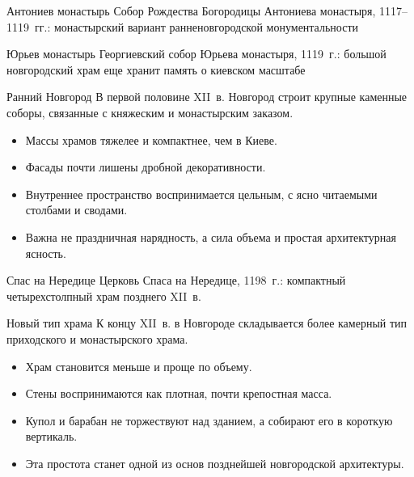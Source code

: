 \begin{frame}{Антониев монастырь}
    {Собор Рождества Богородицы Антониева монастыря, 1117--1119~гг.:
     монастырский вариант ранненовгородской монументальности}
\end{frame}

\begin{frame}{Юрьев монастырь}
    {Георгиевский собор Юрьева монастыря, 1119~г.:
     большой новгородский храм еще хранит память о киевском масштабе}
\end{frame}

\begin{frame}{Ранний Новгород}
  В первой половине XII~в. Новгород строит крупные каменные соборы,
  связанные с княжеским и монастырским заказом.

  \begin{itemize}
    \item Массы храмов тяжелее и компактнее, чем в Киеве.
    \item Фасады почти лишены дробной декоративности.
    \item Внутреннее пространство воспринимается цельным,
          с ясно читаемыми столбами и сводами.
    \item Важна не праздничная нарядность, а сила объема
          и простая архитектурная ясность.
  \end{itemize}
\end{frame}

\begin{frame}{Спас на Нередице}
    {Церковь Спаса на Нередице, 1198~г.:
     компактный четырехстолпный храм позднего XII~в.}
\end{frame}

\begin{frame}{Новый тип храма}
  К концу XII~в. в Новгороде складывается более камерный тип
  приходского и монастырского храма.

  \begin{itemize}
    \item Храм становится меньше и проще по объему.
    \item Стены воспринимаются как плотная, почти крепостная масса.
    \item Купол и барабан не торжествуют над зданием,
          а собирают его в короткую вертикаль.
    \item Эта простота станет одной из основ позднейшей
          новгородской архитектуры.
  \end{itemize}
\end{frame}


